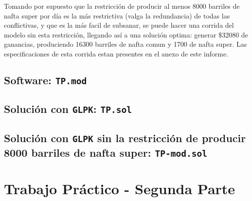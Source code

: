\documentclass[
]{article}
\begin{document}
Tomando por supuesto que la restricción de producir al menos 8000
barriles de nafta super por día es la más restrictiva (valga la
redundancia) de todas las conflictivas, y que es la más facil de
subsanar, se puede hacer una corrida del modelo sin esta restricción,
llegando así a una solución optima: generar \$32080 de ganancias,
produciendo 16300 barriles de nafta comun y 1700 de nafta super. Las
especificaciones de esta corrida estan presentes en el anexo de este
informe.

\newpage

\hypertarget{software-tp.mod}{%
\subsection{\texorpdfstring{Software:
\texttt{TP.mod}}{Software: TP.mod}}\label{software-tp.mod}}



\newpage

\hypertarget{soluciuxf3n-con-glpk-tp.sol}{%
\subsection{\texorpdfstring{Solución con \texttt{GLPK}:
\texttt{TP.sol}}{Solución con GLPK: TP.sol}}\label{soluciuxf3n-con-glpk-tp.sol}}



\newpage

\hypertarget{soluciuxf3n-con-glpk-sin-la-restricciuxf3n-de-producir-8000-barriles-de-nafta-super-tp-mod.sol}{%
\subsection{\texorpdfstring{Solución con \texttt{GLPK} sin la
restricción de producir 8000 barriles de nafta super:
\texttt{TP-mod.sol}}{Solución con GLPK sin la restricción de producir 8000 barriles de nafta super: TP-mod.sol}}\label{soluciuxf3n-con-glpk-sin-la-restricciuxf3n-de-producir-8000-barriles-de-nafta-super-tp-mod.sol}}



\newpage

\hypertarget{trabajo-pruxe1ctico---segunda-parte}{%
\section{Trabajo Práctico - Segunda
Parte}\label{trabajo-pruxe1ctico---segunda-parte}}
\end{document}
